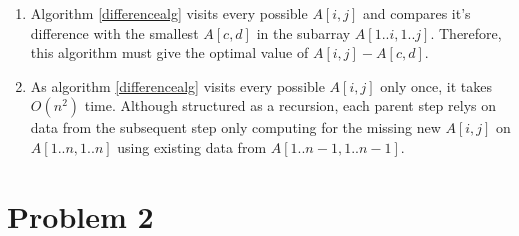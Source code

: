 \documentclass{article}
\begin{document}
\begin{enumerate}[label=(\alph*)]
\begin{algorithm}
    \end{algorithm}


    \item Algorithm \ref{differencealg} visits every possible $A[i, j]$
        and compares it's difference with the smallest $A[c,d]$ in the subarray $A[1..i, 1..j]$.
        Therefore, this algorithm must give the optimal value of $A[i, j]-A[c, d]$.
    \item As algorithm \ref{differencealg} visits every possible $A[i, j]$ only once,
        it takes $O(n^2)$ time.
        Although structured as a recursion, each parent step relys on data from the subsequent step
        only computing for the missing new $A[i, j]$ on $A[1..n, 1..n]$ using existing data from $A[1..n-1, 1..n-1]$.
\end{enumerate}

\section{Problem 2}
\end{document}
